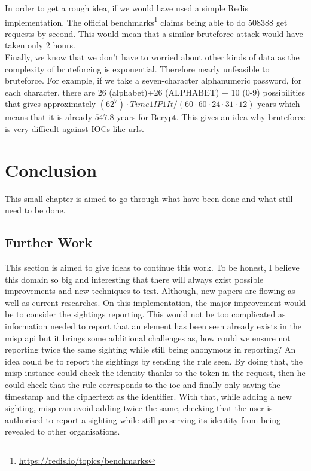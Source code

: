 \documentclass{eplmastersthesis}
\begin{document}
In order to get a rough idea, if we would have used a simple Redis implementation. The official benchmarks\footnote{\url{https://redis.io/topics/benchmarks}} claims being able to do 508388 get requests by second. This would mean that a similar bruteforce attack would have taken only 2 hours.\\

Finally, we know that we don't have to worried about other kinds of data as the complexity of bruteforcing is exponential.
Therefore nearly unfeasible to bruteforce. For example, if we take a seven-character alphanumeric password, for each character, there are 26 (alphabet)+26 (ALPHABET) + 10 (0-9) possibilities that gives approximately $(62^7) \cdot Time1IP1It/(60\cdot 60\cdot 24\cdot 31\cdot 12)$ years which means that it is already $547.8$ years for Bcrypt.
This gives an idea why bruteforce is very difficult against IOCs like \glspl{url}.\\ 


\chapter{Conclusion}

This small chapter is aimed to go through what have been done and what still need to be done.

\section{Further Work}
This section is aimed to give ideas to continue this work. To be honest, I believe this domain so big and interesting that there will always exist possible improvements and new techniques to test. Although, new papers are flowing as well as current researches.
On this implementation, the major improvement would be to consider the sightings reporting. This would not be too complicated as information needed to report that an element has been seen already exists in the \gls{misp} \gls{api} but it brings some additional challenges as, how could we ensure not reporting twice the same sighting while still being anonymous in reporting?
An idea could be to report the sightings by sending the rule seen. By doing that, the \gls{misp} instance could check the identity thanks to the token in the request, then he could check that the rule corresponds to the \gls{ioc} and finally only saving the timestamp and the ciphertext as the identifier.
With that, while adding a new sighting, \gls{misp} can avoid adding twice the same, checking that the user is authorised to report a sighting while still preserving its identity from being revealed to other organisations.\\
\end{document}
